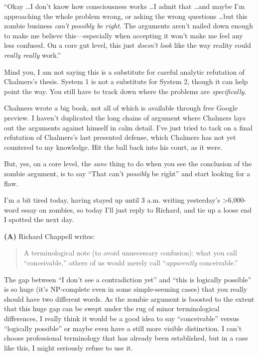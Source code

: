 {
 ``Okay \ldots I don't know how
consciousness works \ldots I admit that \ldots and maybe
I'm approaching the whole problem wrong, or asking the
wrong questions \ldots but this zombie business
\textit{can't possibly be right.} The arguments
aren't nailed down enough to make me believe
this---especially when accepting it won't make me feel
any less confused. On a core gut level, this just
\textit{doesn't look} like the way reality could
\textit{really really} work.''}

{
 Mind you, I am not saying this is a substitute for careful
analytic refutation of Chalmers's thesis. System 1 is
not a substitute for System 2, though it can help point the way. You
still have to track down where the problems are \textit{specifically}.}

{
 Chalmers wrote a big book, not all of which is available through
free Google preview. I haven't duplicated the long
chains of argument where Chalmers lays out the arguments against
himself in calm detail. I've just tried to tack on a
final refutation of Chalmers's last presented defense,
which Chalmers has not yet countered to my knowledge. Hit the ball back
into his court, as it were.}

{
 But, yes, on a core level, the \textit{sane} thing to do when you
see the conclusion of the zombie argument, is to say
``That can't \textit{possibly} be
right'' and start looking for a flaw.}

\myendsectiontext


\bigskip


{
 I'm a bit tired today, having stayed up until 3
a.m. writing yesterday's {\textgreater}6,000-word essay
on zombies, so today I'll just reply to Richard, and
tie up a loose end I spotted the next day.}

{
 \textbf{(A)} Richard Chappell writes:}

\begin{quote}
{
 A terminological note (to avoid unnecessary confusion): what you
call ``conceivable,'' others of us
would merely call ``\textit{apparently}
conceivable.''}
\end{quote}

{
 The gap between ``I don't see a
contradiction yet'' and ``this is
logically possible'' is so huge (it's
\textsf{NP}-complete even in some simple-seeming cases) that you really should
have two different words. As the zombie argument is boosted to the
extent that this huge gap can be swept under the rug of minor
terminological differences, I really think it would be a good idea to
say ``conceivable'' versus
``logically possible'' or maybe even
have a still more visible distinction. I can't choose
professional terminology that has already been established, but in a
case like this, I might seriously refuse to use it.}

